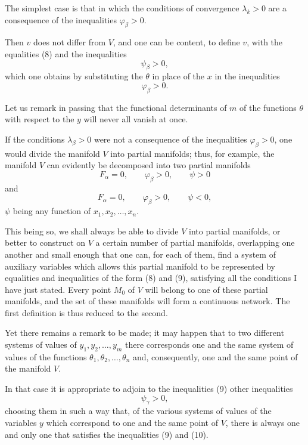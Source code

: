 \documentclass{article}
\begin{document}
The simplest case is that in which the conditions of convergence $\lambda_{k} > 0$ are a consequence of the inequalities $\varphi_{\beta} > 0$.

Then $v$ does not differ from $V$, and one can be content, to define $v$, with the equalities (8) and the inequalities
\[
\psi_{\beta} > 0,
\tag{9}
\]
which one obtains by substituting the $\theta$ in place of the $x$ in the inequalities
\[
\varphi_{\beta} > 0.
\]

Let us remark in passing that the functional determinants of $m$ of the functions $\theta$ with respect to the $y$ will never all vanish at once.

If the conditions $\lambda_{\beta} > 0$ were not a consequence of the inequalities $\varphi_{\beta} > 0$, one would divide the manifold $V$ into partial manifolds; thus, for example, the manifold $V$ can evidently be decomposed into two partial manifolds
\[
F_{\alpha} = 0, \qquad \varphi_{\beta} > 0, \qquad \psi > 0
\]
and
\[
F_{\alpha} = 0, \qquad \varphi_{\beta} > 0, \qquad \psi < 0,
\]
$\psi$ being any function of $x_{1}, x_{2}, \ldots, x_{n}$.

This being so, we shall always be able to divide $V$ into partial manifolds, or better to construct on $V$ a certain number of partial manifolds, overlapping one another and small enough that one can, for each of them, find a system of auxiliary variables which allows this partial manifold to be represented by equalities and inequalities of the form (8) and (9), satisfying all the conditions I have just stated. Every point $M_{0}$ of $V$ will belong to one of these partial manifolds, and the set of these manifolds will form a continuous network. The first definition is thus reduced to the second.

Yet there remains a remark to be made; it may happen that to two different systems of values of $y_{1}, y_{2}, \ldots, y_{m}$ there corresponds one and the same system of values of the functions $\theta_{1}, \theta_{2}, \ldots, \theta_{n}$ and, consequently, one and the same point of the manifold $V$.

In that case it is appropriate to adjoin to the inequalities (9) other inequalities
\[
\psi_{\gamma} > 0,
\tag{10}
\]
choosing them in such a way that, of the various systems of values of the
variables $y$ which correspond to one and the same point of $V$, there is always one and only one that satisfies the inequalities (9) and (10).
\end{document}
